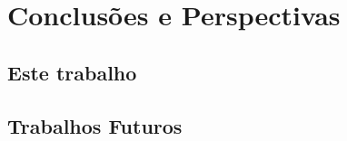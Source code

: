 


\chapter{Conclusões e Perspectivas}
\label{sec:conclusao}


\section{Este trabalho}
\label{sec:conclusao:this}




\section{Trabalhos Futuros}
\label{sec:conclusao:future}


